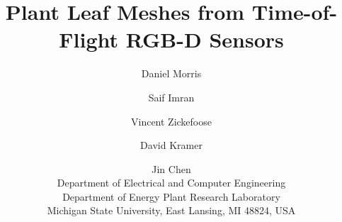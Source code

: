 \documentclass[10pt,twocolumn,letterpaper]{article}
\begin{document}
\title{Plant Leaf Meshes from Time-of-Flight RGB-D Sensors}

\author{
Daniel Morris \and Saif Imran \and Vincent Zickefoose \and David Kramer \and Jin Chen\\
Department of Electrical and Computer Engineering\\
Department of Energy Plant Research Laboratory\\
Michigan State University, East Lansing, MI 48824, USA
}

\maketitle






















{\small


}
\end{document}
